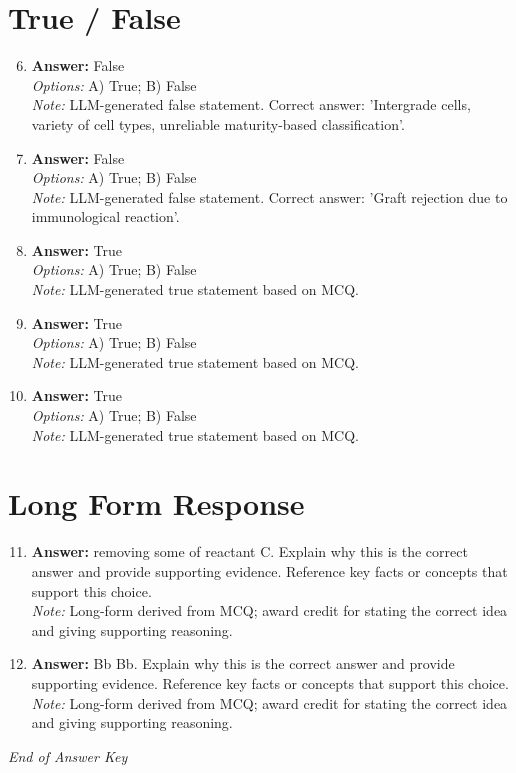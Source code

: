 \documentclass[12pt]{article}
\begin{document}
\section*{True / False}
\begin{enumerate}[label=\arabic*.]
\setcounter{enumi}{5}
\item \textbf{Answer:} False
\\ \textit{Options:} A) True; B) False
\\ \textit{Note:} LLM-generated false statement. Correct answer: 'Intergrade cells, variety of cell types, unreliable maturity-based classification'.
\item \textbf{Answer:} False
\\ \textit{Options:} A) True; B) False
\\ \textit{Note:} LLM-generated false statement. Correct answer: 'Graft rejection due to immunological reaction'.
\item \textbf{Answer:} True
\\ \textit{Options:} A) True; B) False
\\ \textit{Note:} LLM-generated true statement based on MCQ.
\item \textbf{Answer:} True
\\ \textit{Options:} A) True; B) False
\\ \textit{Note:} LLM-generated true statement based on MCQ.
\item \textbf{Answer:} True
\\ \textit{Options:} A) True; B) False
\\ \textit{Note:} LLM-generated true statement based on MCQ.
\end{enumerate}

\section*{Long Form Response}
\begin{enumerate}[label=\arabic*.]
\setcounter{enumi}{10}
\item \textbf{Answer:} removing some of reactant C. Explain why this is the correct answer and provide supporting evidence. Reference key facts or concepts that support this choice.
\\ \textit{Note:} Long-form derived from MCQ; award credit for stating the correct idea and giving supporting reasoning.
\item \textbf{Answer:} Bb Bb. Explain why this is the correct answer and provide supporting evidence. Reference key facts or concepts that support this choice.
\\ \textit{Note:} Long-form derived from MCQ; award credit for stating the correct idea and giving supporting reasoning.
\end{enumerate}

\vfill
\noindent\textit{End of Answer Key}
\end{document}
